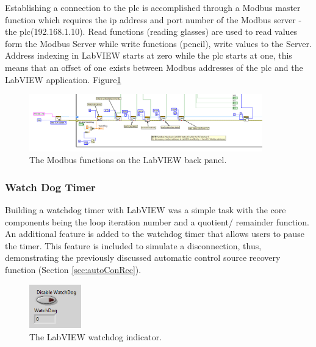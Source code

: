             Establishing a connection to the \acrshort{plc} is accomplished through a Modbus master function which requires the \acrshort{ip} address and port number of the Modbus server - the \acrshort{plc}(192.168.1.10). 
            Read functions (reading glasses) are used to read values form the Modbus Server while write functions (pencil), write values to the Server. Address indexing in LabVIEW starts at zero while the \acrshort{plc} starts at one, this means that an offset of one exists between Modbus addresses of the \acrshort{plc} and the LabVIEW application. Figure\ref{fig:modLabFun}
            
        \begin{figure}[H]
            \centering
            \includegraphics[width = 0.9\textwidth]{2_images/labViewModFunc}
            \caption{The Modbus functions on the LabVIEW back panel.}
            \label{fig:modLabFun}
        \end{figure}     
        
        \subsubsection{Watch Dog Timer}
            Building a watchdog timer with LabVIEW was a simple task with the core components being the loop iteration number and a quotient/ remainder function. An additional feature is added to the watchdog timer that allows users to pause the timer. This feature is included to simulate a disconnection, thus, demonstrating the  previously discussed automatic control source recovery function (Section \ref{sec:autoConRec}).

        \begin{figure}[H]
            \centering
            \includegraphics[width = 0.2\textwidth]{2_images/labFrontWatchDog}
            \caption{The LabVIEW watchdog indicator.}
            \label{fig:labFrontWatchDog}
        \end{figure}    
            
